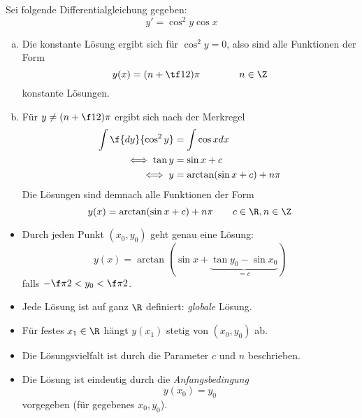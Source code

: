 \begin{ex} \label{2.2}
	Sei folgende Differentialgleichung gegeben:
	\[
		y' = \cos^2 y \cos x
	\]
	\begin{enumerate}[a)]
		\item
			Die konstante Lösung ergibt sich für $\cos^2 y = 0$, also sind alle Funktionen der Form
			\[
				y(x) = (n + \tf 12) \pi \qquad \qquad n \in \Z
			\]
			konstante Lösungen.
		\item
			Für $y \neq (n + \f 12) \pi$ ergibt sich nach der Merkregel
			\begin{align*}
				\int \f {dy}{\cos^2 y} &= \int \cos x dx \\
				\iff \tan y &= \sin x + c \\
				\iff y &= \arctan(\sin x + c) + n \pi
			\end{align*}
			Die Lösungen sind demnach alle Funktionen der Form
			\[
				y(x) = \arctan(\sin x + c) + n \pi \qquad c \in \R, n \in \Z
			\]
	\end{enumerate}
	\begin{note}[Beobachtungen]
		\begin{itemize}
			\item
				Durch jeden Punkt $(x_0, y_0)$ geht genau eine Lösung:
				\[
					y(x) = \arctan(\sin x + \underbrace{\tan y_0 - \sin x_0}_{=c})
				\]
				falls $- \f \pi 2 < y_0 < \f \pi 2$.
			\item
				Jede Lösung ist auf ganz $\R$ definiert: \emph{globale} Lösung.
			\item
				Für festes $x_1 \in \R$ hängt $y(x_1)$ stetig von $(x_0, y_0)$ ab.
			\item
				Die Lösungsvielfalt ist durch die Parameter $c$ und $n$ beschrieben.
			\item
				Die Lösung ist eindeutig durch die \emph{Anfangsbedingung}
				\[
					y(x_0) = y_0 
				\]
				vorgegeben (für gegebenes $x_0, y_0$).
		\end{itemize}
	\end{note}
\end{ex}


